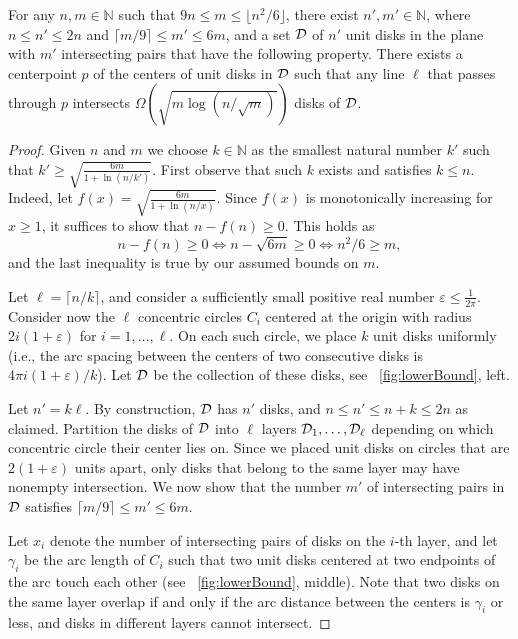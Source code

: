 \documentclass{llncs}
\begin{document}
\begin{theorem}\label{thm:lowerjoint_unit}
For any $n,m\in \mathbb{N}$ such that $9n \leq m \leq \lfloor n^2/6 \rfloor$,
there exist $n', m' \in \mathbb{N}$, where $n \leq n' \leq 2n$ and $\lceil m/9 \rceil \leq m' \leq 6m$,
and a set $\cal{D}$ of $n'$ unit disks in the plane with $m'$ intersecting pairs
that have the following property.
There exists a centerpoint $p$ of the centers of unit disks in $\cal{D}$
such that any line $\ell$ that passes through $p$
intersects $\Omega( \sqrt{m\log (n/\sqrt{m})})$ disks of $\cal{D}$.
\end{theorem}
\begin{proof}
Given $n$ and $m$ we choose $k\in \mathbb{N}$ as the smallest natural number 
$k'$ such that $k' \geq \sqrt{\frac{{6m}}{{1+\ln (n/k')}}}$.
First observe that such $k$ exists and satisfies $k\leq n$. 
Indeed, let $f(x)=\sqrt{\frac{6m}{1+\ln{(n/x)}}}$. 
Since $f(x)$ is monotonically increasing for $x \geq 1$, 
it suffices to show that $n-f(n) \geq 0$. This holds as
$$
n-f(n)  \geq 0 
\Leftrightarrow 
n-\sqrt{6m}  \geq 0
\Leftrightarrow
 n^2/6 \geq m,$$
and the last inequality is true by our assumed bounds on $m$.

Let $\ell=\lceil n/k \rceil$, and consider a sufficiently
small positive real number \mbox{$\varepsilon \leq \frac{1}{2\pi}$}.
Consider now the $\ell$ concentric circles $C_i$ centered at the origin with radius \mbox{$2i(1+\varepsilon)$} for $i=1, \dots, \ell$.
On each such circle, we place $k$ unit disks uniformly (i.e., the arc spacing between the centers of two consecutive disks is $4\pi i(1+\varepsilon)/k$).
Let $\cal{D}$ be the collection of these disks, see \figurename~\ref{fig:lowerBound}, left. 

Let $n' = k\ell$.
By construction, $\cal{D}$ has $n'$ disks,
and $n \leq n' \leq n+k \leq 2n$ as claimed.
Partition the disks of $\cal{D}$ into $\ell$ layers ${\cal D}_1, \dots, {\cal D}_{\ell}$ depending on which concentric circle their center lies on.
Since we placed unit disks on circles that are $2(1+\varepsilon)$ units apart, only disks that belong to the same layer may have nonempty intersection.
We now show that the number $m'$ of intersecting pairs in $\cal{D}$
satisfies $\lceil m/9 \rceil \leq m' \leq 6m$.

Let $x_i$ denote the number of intersecting pairs of disks on the $i$-th layer, 
and let $\gamma_i$ be the 
 arc length of $C_i$ such that two unit disks centered at two endpoints of the arc touch each other (see \figurename~\ref{fig:lowerBound}, middle).
Note that two disks on the same layer overlap if and only if the arc distance between the centers is $\gamma_i$ or less, and disks in different layers cannot intersect. 


\end{proof}
\end{document}
